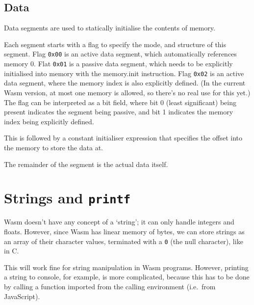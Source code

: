 \documentclass[10pt,a4paper]{article}
\newcommand{\hex}[1]{\texttt{#1}}
\newcommand{\instr}[1]{\textsf{#1}}
\begin{document}
\subsection*{Data}

Data segments are used to statically initialise the contents of memory.



Each segment starts with a flag to specify the mode, and structure of this segment. Flag \hex{0x00} is an active data segment, which automatically references memory 0. Flat \hex{0x01} is a passive data segment, which needs to be explicitly initialised into memory with the \instr{memory.init} instruction. Flag \hex{0x02} is an active data segment, where the memory index is also explicitly defined. (In the current Wasm version, at most one memory is allowed, so there's no real use for this yet.)
The flag can be interpreted as a bit field, where bit 0 (least significant) being present indicates the segment being passive, and bit 1 indicates the memory index being explicitly defined.

This is followed by a constant initialiser expression that specifies the offset into the memory to store the data at.



The remainder of the segment is the actual data itself.



\section*{Strings and \texttt{printf}}

Wasm doesn't have any concept of a `string'; it can only handle integers and floats. However, since Wasm has linear memory of bytes, we can store strings as an array of their character values, terminated with a \texttt{0} (the null character), like in C.

This will work fine for string manipulation in Wasm programs. However, printing a string to console, for example, is more complicated, because this has to be done by calling a function imported from the calling environment (i.e.\ from JavaScript).

\end{document}
